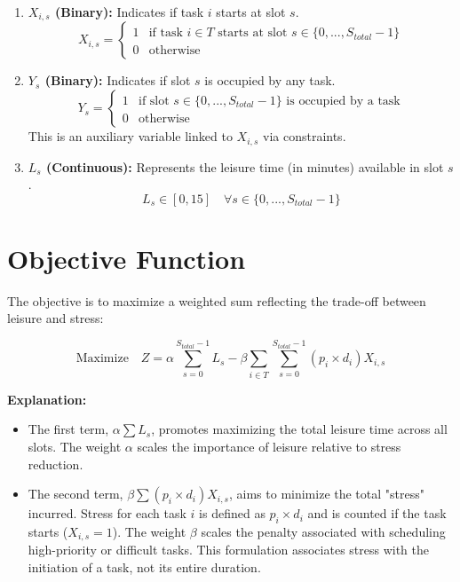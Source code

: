 \documentclass{article}
\begin{document}
\begin{enumerate}
    \item \textbf{$X_{i,s}$ (Binary):} Indicates if task $i$ starts at slot $s$.
    \[ X_{i,s} = \begin{cases} 1 & \text{if task } i \in T \text{ starts at slot } s \in \{0, ..., S_{total}-1\} \\ 0 & \text{otherwise} \end{cases} \]

    \item \textbf{$Y_{s}$ (Binary):} Indicates if slot $s$ is occupied by any task.
    \[ Y_{s} = \begin{cases} 1 & \text{if slot } s \in \{0, ..., S_{total}-1\} \text{ is occupied by a task} \\ 0 & \text{otherwise} \end{cases} \]
    This is an auxiliary variable linked to $X_{i,s}$ via constraints.

    \item \textbf{$L_{s}$ (Continuous):} Represents the leisure time (in minutes) available in slot $s$.
    \[ L_{s} \in [0, 15] \quad \forall s \in \{0, ..., S_{total}-1\} \]
\end{enumerate}

\section{Objective Function}

The objective is to maximize a weighted sum reflecting the trade-off between leisure and stress:

\[
\text{Maximize} \quad Z = \alpha \sum_{s=0}^{S_{total}-1} L_s - \beta \sum_{i \in T} \sum_{s=0}^{S_{total}-1} (p_i \times d_i) X_{i,s}
\]

\textbf{Explanation:}
\begin{itemize}
    \item The first term, $\alpha \sum L_s$, promotes maximizing the total leisure time across all slots. The weight $\alpha$ scales the importance of leisure relative to stress reduction.
    \item The second term, $\beta \sum (p_i \times d_i) X_{i,s}$, aims to minimize the total "stress" incurred. Stress for each task $i$ is defined as $p_i \times d_i$ and is counted if the task starts ($X_{i,s}=1$). The weight $\beta$ scales the penalty associated with scheduling high-priority or difficult tasks. This formulation associates stress with the initiation of a task, not its entire duration.
\end{itemize}
\end{document}
